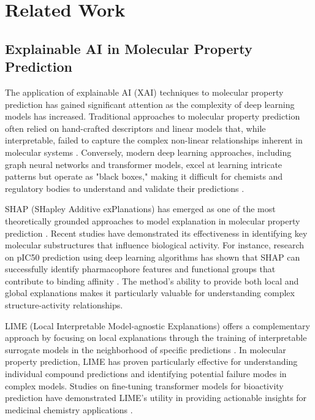 \documentclass[preprint,12pt]{elsarticle}
\begin{document}
\section{Related Work}
\label{sec:literature}

\subsection{Explainable AI in Molecular Property Prediction}

The application of explainable AI (XAI) techniques to molecular property prediction has gained significant attention as the complexity of deep learning models has increased. Traditional approaches to molecular property prediction often relied on hand-crafted descriptors and linear models that, while interpretable, failed to capture the complex non-linear relationships inherent in molecular systems \cite{rogers2010extended}. Conversely, modern deep learning approaches, including graph neural networks and transformer models, excel at learning intricate patterns but operate as "black boxes," making it difficult for chemists and regulatory bodies to understand and validate their predictions \cite{samek2017explainable}.

SHAP (SHapley Additive exPlanations) has emerged as one of the most theoretically grounded approaches to model explanation in molecular property prediction \cite{lundberg2017shap}. Recent studies have demonstrated its effectiveness in identifying key molecular substructures that influence biological activity. For instance, research on pIC50 prediction using deep learning algorithms has shown that SHAP can successfully identify pharmacophore features and functional groups that contribute to binding affinity \cite{researchgate_pic50_2024}. The method's ability to provide both local and global explanations makes it particularly valuable for understanding complex structure-activity relationships.

LIME (Local Interpretable Model-agnostic Explanations) offers a complementary approach by focusing on local explanations through the training of interpretable surrogate models in the neighborhood of specific predictions \cite{ribeiro2016lime}. In molecular property prediction, LIME has proven particularly effective for understanding individual compound predictions and identifying potential failure modes in complex models. Studies on fine-tuning transformer models for bioactivity prediction have demonstrated LIME's utility in providing actionable insights for medicinal chemistry applications \cite{imani_alzheimer_2024}.
\end{document}
